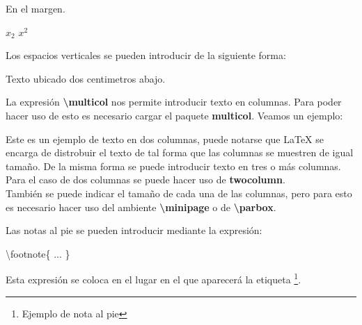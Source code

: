 \documentclass[letterpaper,11pt]{article}
\begin{document}
\hspace{-3cm}En el margen.

$x_{2}$ \hspace{4cm} $x^{2}$

Los espacios verticales se pueden introducir de la siguiente forma:

\vspace{2cm}Texto ubicado dos centimetros abajo.




La expresión \textbf{\textbackslash multicol} nos permite introducir texto en columnas. Para poder hacer uso de esto es necesario cargar el paquete \textbf{multicol}. Veamos un ejemplo:

\begin{multicols}{2}
Este es  un ejemplo de texto en dos columnas, puede notarse que \LaTeX{} se encarga de distrobuir el texto de tal forma que las columnas se muestren de igual tamaño. De la misma forma se puede introducir texto en tres o más columnas.\\
Para el caso de dos columnas se puede hacer uso de \textbf{twocolumn}.\\
También se puede indicar el tamaño de cada una de las columnas, pero para esto es necesario hacer uso del ambiente \textbf{\textbackslash minipage} 
o de \textbf{\textbackslash parbox}.
\end{multicols}

\pagebreak


Las notas al pie se pueden introducir mediante la expresión:
\begin{center}
\textbackslash footnote\{ ... \}
\end{center}
Esta expresión se coloca en el lugar en el que aparecerá la etiqueta \footnote{Ejemplo de nota al pie}.

\end{document}
